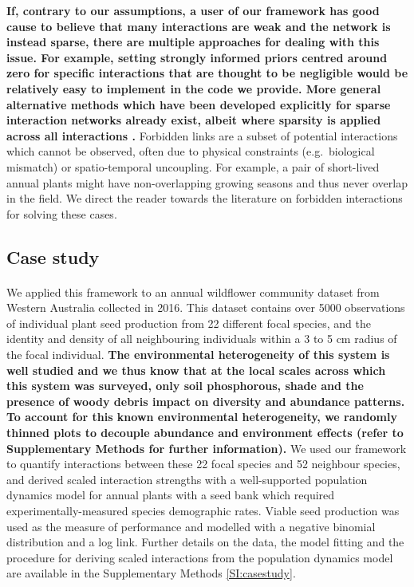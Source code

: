 \documentclass[a4,12pt]{article}
\begin{document}
\begin{refsection}
    \textbf{If, contrary to our assumptions, a user of our framework has good cause to believe that many interactions are weak and the network is instead sparse, there are multiple approaches for dealing with this issue. For example, setting strongly informed priors centred around zero for specific interactions that are thought to be negligible would be relatively easy to implement in the code we provide. More general alternative methods which have been developed explicitly for sparse interaction networks already exist, albeit where sparsity is applied across all interactions \parencite{Weiss-Lehman2022}.} Forbidden links are a subset of potential interactions which cannot be observed, often due to physical constraints (e.g.\ biological mismatch) or spatio-temporal uncoupling. For example, a pair of short-lived annual plants might have non-overlapping growing seasons and thus never overlap in the field. We direct the reader towards the literature on forbidden interactions \parencite{Olesen2011, Jordano2016} for solving these cases. 

    \subsection{Case study}

       \paragraph{}
        We applied this framework to an annual wildflower community dataset from Western Australia collected in 2016. This dataset contains over 5000 observations of individual plant seed production from 22 different focal species, and the identity and density of all neighbouring individuals within a 3 to 5 cm radius of the focal individual. \textbf{The environmental heterogeneity of this system is well studied \parencite{Dwyer2015} and we thus know that at the local scales across which this system was surveyed, only soil phosphorous, shade and the presence of woody debris impact on diversity and abundance patterns. To account for this known environmental heterogeneity, we randomly thinned plots to decouple abundance and environment effects (refer to Supplementary Methods for further information).} We used our framework to quantify interactions between these 22 focal species and 52 neighbour species, and derived scaled interaction strengths with a well-supported population dynamics model for annual plants with a seed bank \parencite{Levine2009, Bimler2018} which required experimentally-measured species demographic rates. Viable seed production was used as the measure of performance and modelled with a negative binomial distribution and a log link. Further details on the data, the model fitting and the procedure for deriving scaled interactions from the population dynamics model are available in the Supplementary Methods \ref{SI:casestudy}.



\end{refsection}
\end{document}
